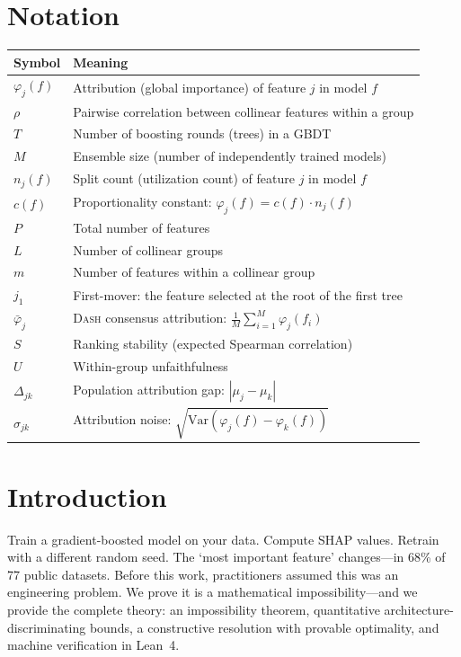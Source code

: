 \documentclass{jmlr}
\newcommand{\Var}{\mathrm{Var}}
\newcommand{\DASH}{\textsc{Dash}}
\begin{document}
\section*{Notation}
\begin{center}
\small
\begin{tabular}{@{}lp{10cm}@{}}
\toprule
\textbf{Symbol} & \textbf{Meaning} \\
\midrule
$\varphi_j(f)$ & Attribution (global importance) of feature $j$ in model $f$ \\
$\rho$ & Pairwise correlation between collinear features within a group \\
$T$ & Number of boosting rounds (trees) in a GBDT \\
$M$ & Ensemble size (number of independently trained models) \\
$n_j(f)$ & Split count (utilization count) of feature $j$ in model $f$ \\
$c(f)$ & Proportionality constant: $\varphi_j(f) = c(f) \cdot n_j(f)$ \\
$P$ & Total number of features \\
$L$ & Number of collinear groups \\
$m$ & Number of features within a collinear group \\
$j_1$ & First-mover: the feature selected at the root of the first tree \\
$\bar\varphi_j$ & \DASH{} consensus attribution: $\frac{1}{M}\sum_{i=1}^M \varphi_j(f_i)$ \\
$S$ & Ranking stability (expected Spearman correlation) \\
$U$ & Within-group unfaithfulness \\
$\Delta_{jk}$ & Population attribution gap: $|\mu_j - \mu_k|$ \\
$\sigma_{jk}$ & Attribution noise: $\sqrt{\Var(\varphi_j(f) - \varphi_k(f))}$ \\
\bottomrule
\end{tabular}
\end{center}


\section{Introduction}
\label{sec:intro}

Train a gradient-boosted model on your data. Compute SHAP values. Retrain with a different random seed. The `most important feature' changes---in 68\% of 77 public datasets. Before this work, practitioners assumed this was an engineering problem. We prove it is a mathematical impossibility---and we provide the complete theory: an impossibility theorem, quantitative architecture-discriminating bounds, a constructive resolution with provable optimality, and machine verification in Lean~4.
\end{document}
